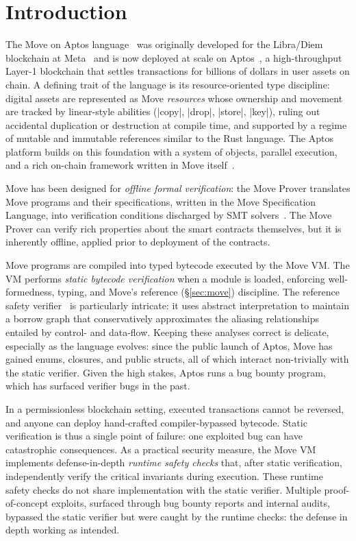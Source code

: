 \section{Introduction}
\label{sec:intro}

The Move on Aptos language~\cite{MoveOnAptosBook} was originally developed for the Libra/Diem blockchain at Meta~\cite{libra_blockchain_white,OLD_MOVE_LANG,blackshear2020resources} and is now deployed at scale on Aptos~\cite{Aptos}, a high-throughput Layer-1 blockchain that settles transactions for billions of dollars in user assets on chain.
A defining trait of the language is its resource-oriented type discipline: digital assets are represented as Move \emph{resources} whose ownership and movement are tracked by linear-style abilities (|copy|, |drop|, |store|, |key|), ruling out accidental duplication or destruction at compile time, and supported by a regime of mutable and immutable references similar to the Rust language.
The Aptos platform builds on this foundation with a system of objects, parallel execution, and a rich on-chain framework written in Move itself~\cite{AptosFrameworkBook,ParkZGXGCLC24}.

Move has been designed for \emph{offline formal verification}: the Move Prover translates Move programs and their specifications, written in the Move Specification Language, into verification conditions discharged by SMT solvers~\cite{DillGPQXZ22,GrieskampEtAl26HO}.
The Move Prover can verify rich properties about the smart contracts themselves, but it is inherently offline, applied prior to deployment of the contracts.

Move programs are compiled into typed bytecode executed by the Move VM.
The VM performs \emph{static bytecode verification} when a module is loaded, enforcing well-formedness, typing, and Move's reference (\S\ref{sec:move}) discipline.
The reference safety verifier~\cite{MoveBorrowChecker} is particularly intricate: it uses abstract interpretation to maintain a borrow graph that conservatively approximates the aliasing relationships entailed by control- and data-flow.
Keeping these analyses correct is delicate, especially as the language evolves: since the public launch of Aptos, Move has gained enums, closures, and public structs, all of which interact non-trivially with the static verifier.
Given the high stakes, Aptos runs a bug bounty program, which has surfaced verifier bugs in the past.

In a permissionless blockchain setting, executed transactions cannot be reversed, and anyone can deploy hand-crafted compiler-bypassed bytecode.
Static verification is thus a single point of failure: one exploited bug can have catastrophic consequences.
As a practical security measure, the Move VM implements defense-in-depth \emph{runtime safety checks} that, after static verification, independently verify the critical invariants during execution.
These runtime safety checks do not share implementation with the static verifier.
Multiple proof-of-concept exploits, surfaced through bug bounty reports and internal audits, bypassed the static verifier but were caught by the runtime checks: the defense in depth working as intended.

